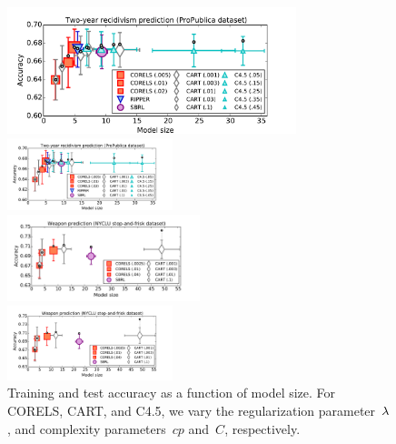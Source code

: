 \begin{figure}[t!]
\begin{center}
\begin{arxiv}
\includegraphics[width=0.75\textwidth]{figs/compas-sparsity-training.pdf}
\end{arxiv}
\begin{kdd}
\includegraphics[trim={12mm, 0mm, 24mm, 5mm}, width=0.43\textwidth]{figs/compas-sparsity-training.pdf}
\end{kdd}
\begin{arxiv}
\includegraphics[width=0.5\textwidth]{figs/frisk-sparsity-training.pdf}
\end{arxiv}
\begin{kdd}
\includegraphics[trim={12mm, 12mm, 24mm, 1mm}, width=0.43\textwidth]{figs/frisk-sparsity-training.pdf}
\end{kdd}
\end{center}
\caption{Training and test accuracy as a function of model size.
%
For CORELS, CART, and C4.5, we vary the regularization parameter~${\lambda}$,
and complexity parameters~$cp$ and~$C$, respectively.
}
\end{figure}
